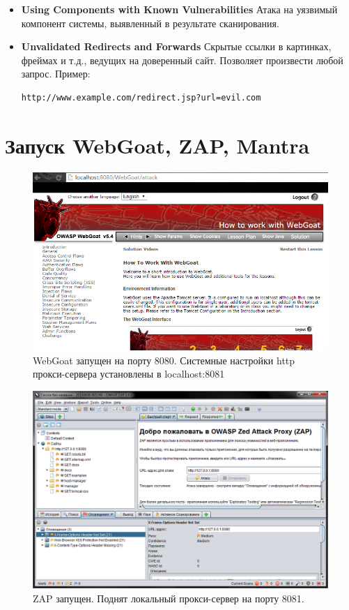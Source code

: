 \documentclass[utf8x, 12pt]{G7-32}
\begin{document}
\begin{itemize}
\item {\textbf{Using Components with Known Vulnerabilities} Атака на уязвимый компонент системы, выявленный в результате сканирования.}

\item {\textbf{Unvalidated Redirects and Forwards} Скрытые ссылки в картинках, фреймах и т.д., ведущих на доверенный сайт. Позволяет произвести любой запрос.
Пример:
\begin{lstlisting}
http://www.example.com/redirect.jsp?url=evil.com
\end{lstlisting}
}
\end{itemize}

\newpage
\section{Запуск WebGoat, ZAP, Mantra}

\begin{figure}[hhh!]
\centering
\includegraphics[width=12cm]{rsrc/webgoat_start}
\caption{WebGoat запущен на порту 8080. Системные настройки http прокси-сервера установлены в localhost:8081}
\end{figure}

\begin{figure}[hhh!]
\centering
\includegraphics[width=12cm]{rsrc/zap_start}
\caption{ZAP запущен. Поднят локальный прокси-сервер на порту 8081.}
\end{figure}
\end{document}
